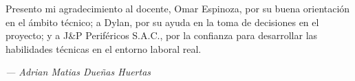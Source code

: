 Presento mi agradecimiento al docente, Omar Espinoza, por su buena orientación en el ámbito técnico; a Dylan, por su ayuda en la toma de decisiones en el proyecto; y a J\&P Periféricos S.A.C., por la confianza para desarrollar las habilidades técnicas en el entorno laboral real.

\begin{flushright}
    \small\textit{--- Adrian Matias Dueñas Huertas}
\end{flushright}